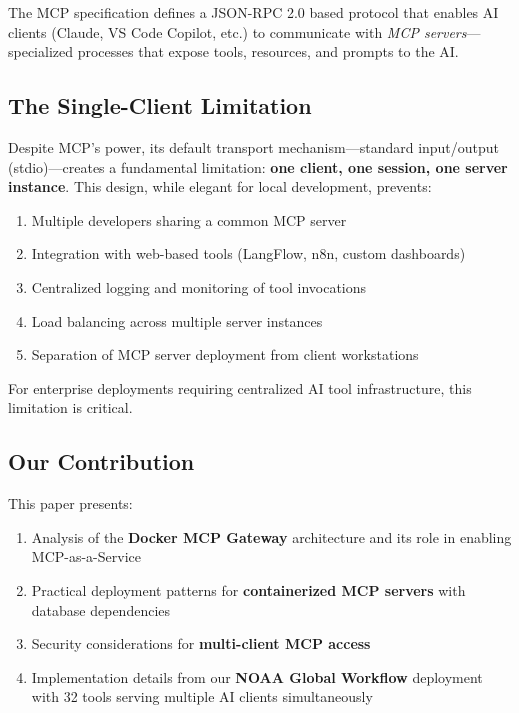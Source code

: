 \documentclass[11pt,letterpaper]{article}
\begin{document}
The MCP specification defines a JSON-RPC 2.0 based protocol that enables AI clients (Claude, VS Code Copilot, etc.) to communicate with \textit{MCP servers}---specialized processes that expose tools, resources, and prompts to the AI.

\subsection{The Single-Client Limitation}

Despite MCP's power, its default transport mechanism---standard input/output (stdio)---creates a fundamental limitation: \textbf{one client, one session, one server instance}. This design, while elegant for local development, prevents:

\begin{enumerate}[noitemsep]
    \item Multiple developers sharing a common MCP server
    \item Integration with web-based tools (LangFlow, n8n, custom dashboards)
    \item Centralized logging and monitoring of tool invocations
    \item Load balancing across multiple server instances
    \item Separation of MCP server deployment from client workstations
\end{enumerate}

For enterprise deployments requiring centralized AI tool infrastructure, this limitation is critical.

\subsection{Our Contribution}

This paper presents:

\begin{enumerate}[noitemsep]
    \item Analysis of the \textbf{Docker MCP Gateway} architecture and its role in enabling MCP-as-a-Service
    \item Practical deployment patterns for \textbf{containerized MCP servers} with database dependencies
    \item Security considerations for \textbf{multi-client MCP access}
    \item Implementation details from our \textbf{NOAA Global Workflow} deployment with 32 tools serving multiple AI clients simultaneously
\end{enumerate}
\end{document}
